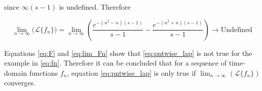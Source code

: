 \documentclass[a4paper,10pt,reqno]{amsart}
\numberwithin{equation}{section}
\newcommand{\lap}{\mathscr{L}}
\begin{document}
since $\infty(s - 1)$ is undefined. Therefore

\begin{equation}\label{eq:lim_Fn}
     \lim_{n \to \infty} \big(\lap\{f_n\}\big) = \lim_{n \to \infty} \left(\frac{e^{-(n^2 - n)(s-1)}}{s-1} - \frac{e^{-(n^2 + n)(s-1)}}{s-1}\right) \to \text{Undefined}
\end{equation}
\vspace{1pt}

Equations \ref{eq:F} and \ref{eq:lim_Fn} show that \ref{eq:pntwise_lap} is not true for the example in \ref{eq:fn}. Therefore it can be concluded that for a sequence of time-domain functions $f_n$, equation \ref{eq:pntwise_lap} is only true if $\lim_{n \to \infty} (\lap\{f_n\})$ converges.
\end{document}
